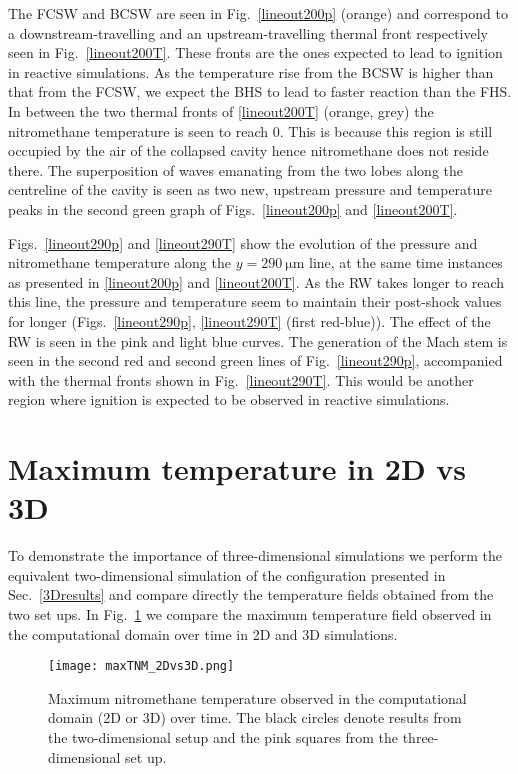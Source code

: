 \documentclass[3p,times,twocolumn]{elsarticle}
\begin{document}
The FCSW and BCSW  are seen in  Fig.\ \ref{lineout200p} (orange) and correspond to a downstream-travelling and an upstream-travelling thermal front respectively seen in  Fig.\ \ref{lineout200T}. These fronts are the ones expected to lead to ignition in reactive simulations. As the temperature rise from the BCSW is higher than that from the FCSW, we expect the BHS to lead to faster reaction than the FHS. In between the two thermal fronts of \ref{lineout200T} (orange, grey) the nitromethane temperature is seen to reach 0. This is because this region is still occupied by the air of the collapsed cavity hence nitromethane does not reside there. The superposition of waves emanating from the two lobes along the centreline of the cavity is seen as two new, upstream pressure and temperature peaks in the second green graph of Figs.\ \ref{lineout200p} and \ref{lineout200T}.

Figs.\ \ref{lineout290p} and \ref{lineout290T} show the evolution of the pressure and nitromethane temperature along the   $y=\SI{290}{\micro \meter}$ line, at the same time instances as presented in  \ref{lineout200p} and \ref{lineout200T}. As the RW takes longer to reach this line, the pressure and temperature seem to maintain their post-shock values for longer (Figs.\ \ref{lineout290p}, \ref{lineout290T} (first red-blue)). The effect of the RW is seen in the pink and light blue curves. The generation of the Mach stem is seen in the second red and second green lines of  Fig.\ \ref{lineout290p}, accompanied with the thermal fronts shown in Fig.\ \ref{lineout290T}. This would be another region where ignition is expected to be observed in reactive simulations.

\section{Maximum temperature in 2D vs 3D}


To demonstrate the importance of three-dimensional simulations we perform the equivalent two-dimensional simulation of the configuration presented in Sec.\ \ref{3Dresults} and compare directly the temperature fields obtained from the two set ups. In Fig.\ \ref{2Dvs3DTmax} we compare the maximum temperature field observed in the computational domain over time in 2D and 3D simulations.

\begin{figure}[!t]
\centering
\texttt{[image: maxTNM\_2Dvs3D.png]}     
\caption{Maximum nitromethane temperature observed in the computational domain (2D or 3D) over time. The black circles denote results from the two-dimensional setup and the pink squares from the three-dimensional set up. }
\label{2Dvs3DTmax}
\end{figure}
\end{document}
